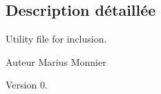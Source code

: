 \subsection{Description détaillée}
Utility file for inclusion. 

\begin{DoxyAuthor}{Auteur}
Marius Monnier 
\end{DoxyAuthor}
\begin{DoxyVersion}{Version}
0. 
\end{DoxyVersion}
